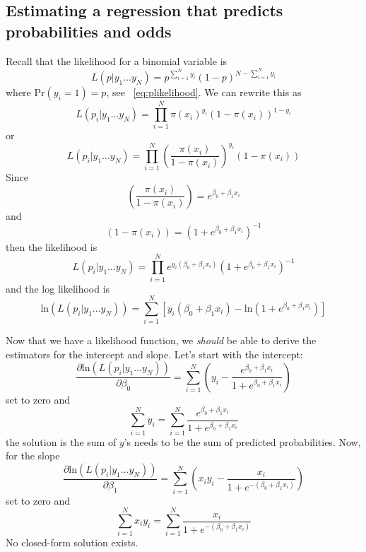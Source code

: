 \subsection{Estimating a regression that predicts probabilities and odds}
Recall that the likelihood for a binomial variable is
\[
L\left(p \vert y_1 \ldots y_N\right)=p^{\sum_{i=1}^Ny_i}\left(1-p\right)^{N-\sum_{i=1}^Ny_i}
\]
where $\mbox{Pr}\left(y_i = 1\right) = p$, see ~\eqref{eq:plikelihood}. We can rewrite this as
\begin{equation}
L\left(p_i \vert y_1 \ldots y_N\right)=\prod_{i=1}^N\pi\left(x_i\right)^{y_i}\left(1-\pi\left(x_i\right)\right)^{1-y_i}
\end{equation}
or
\begin{equation}
L\left(p_i \vert y_1 \ldots y_N\right)=\prod_{i=1}^N \left(\frac{\pi\left(x_i\right)}{1-\pi\left(x_i\right)}\right)^{y_i}\left(1-\pi\left(x_i\right)\right)
\end{equation}
Since
\[
\left(\frac{\pi\left(x_i\right)}{1-\pi\left(x_i\right)}\right)=e^{\beta_0+\beta_1x_i}
\]
and
\[
\left(1-\pi\left(x_i\right)\right) = \left(1+e^{\beta_0+\beta_1x_i}\right)^{-1}
\]
then the likelihood is
\begin{equation}
L\left(p_i \vert y_1 \ldots y_N\right)=\prod_{i=1}^N e^{y_i\left(\beta_0+\beta_1x_i\right)}\left(1+e^{\beta_0+\beta_1x_i}\right)^{-1}
\end{equation}
and the log likelihood is
\begin{equation}
\mbox{ln}\left(L\left(p_i \vert y_1 \ldots y_N\right)\right)=\sum_{i=1}^N \left[y_i\left(\beta_0+\beta_1x_i\right)-\mbox{ln}\left(1+e^{\beta_0+\beta_1x_i}\right)\right]
\end{equation}

Now that we have a likelihood function, we {\it should} be able to derive the estimators for the intercept and slope. Let's start with the intercept:
\begin{equation}
\frac{\partial\mbox{ln}\left(L\left(p_i \vert y_1 \ldots y_N\right)\right)}{\partial\beta_0}=\sum_{i=1}^N\left(y_i-\frac{e^{\beta_0+\beta_1x_i}}{1+e^{\beta_0+\beta_1x_i}}\right)
\end{equation}
set to zero and
\begin{equation}
\sum_{i=1}^Ny_i=\sum_{i=1}^N\frac{e^{\beta_0+\beta_1x_i}}{1+e^{\beta_0+\beta_1x_i}}
\end{equation}
the solution is the sum of $y$'s needs to be the sum of predicted probabilities. Now, for the slope
\begin{equation}
\frac{\partial\mbox{ln}\left(L\left(p_i \vert y_1 \ldots y_N\right)\right)}{\partial\beta_1}=\sum_{i=1}^N\left(x_iy_i-\frac{x_i}{1+e^{-\left(\beta_0+\beta_1x_i\right)}}\right)
\end{equation}
set to zero and
\begin{equation}
\sum_{i=1}^Nx_iy_i=\sum_{i=1}^N\frac{x_i}{1+e^{-\left(\beta_0+\beta_1x_i\right)}}
\end{equation}
No closed-form solution exists.

